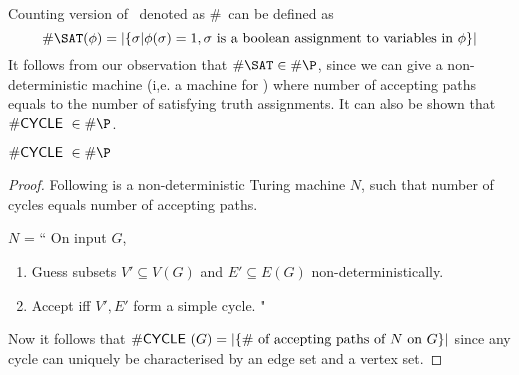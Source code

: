 \documentclass{report}
\newcommand{\CYCLE}{{\sf CYCLE~}}
\begin{document}


Counting version of \SAT~denoted as \#\SAT~can be defined as 
\[ \#\SAT(\phi) = |\{ \sigma | \phi(\sigma) = 1, \sigma \text{ is a boolean
assignment to variables in } \phi \}| \]
It follows from our observation that $\#\SAT \in \#\P$, since we can give a
non-deterministic machine (i,e. a machine for \SAT) where number of accepting
paths equals to the number of satisfying truth assignments. It can also be
shown that $\#\CYCLE \in \#\P$.

\begin{claim}
$\#\CYCLE \in \#\P$
\end{claim}
\begin{proof}
Following is a non-deterministic Turing machine $N$, such that number of
cycles equals number of accepting paths.

$N$ = `` On input $G$,
\begin{enumerate}
\item Guess subsets $V' \subseteq V(G)$ and $E' \subseteq E(G)$ 
non-deterministically.
\item Accept iff $V', E'$ form a simple cycle. "
\end{enumerate}

Now it follows that $\#\CYCLE(G) = |\{ \# \text{ of accepting paths of } N
\text{ on } G \}|$ since any cycle can uniquely be characterised by an edge set
and a vertex set.
\end{proof}
\end{document}
